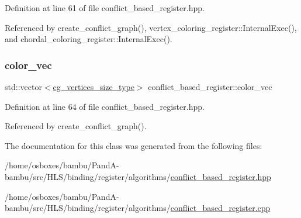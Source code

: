Definition at line 61 of file conflict\+\_\+based\+\_\+register.\+hpp.



Referenced by create\+\_\+conflict\+\_\+graph(), vertex\+\_\+coloring\+\_\+register\+::\+Internal\+Exec(), and chordal\+\_\+coloring\+\_\+register\+::\+Internal\+Exec().

\mbox{\label{classconflict__based__register_af97bd1e6d47a4205d227f72319a234e0}} 
\subsubsection{\texorpdfstring{color\+\_\+vec}{color\_vec}}
{\footnotesize\ttfamily std\+::vector$<$\hyperlink{classconflict__based__register_a7708aaa8ca3c7edc5006102d258ce126}{cg\+\_\+vertices\+\_\+size\+\_\+type}$>$ conflict\+\_\+based\+\_\+register\+::color\+\_\+vec\hspace{0.3cm}{\ttfamily [private]}}



Definition at line 64 of file conflict\+\_\+based\+\_\+register.\+hpp.



Referenced by create\+\_\+conflict\+\_\+graph().



The documentation for this class was generated from the following files\+:\begin{DoxyCompactItemize}
\item 
/home/osboxes/bambu/\+Pand\+A-\/bambu/src/\+H\+L\+S/binding/register/algorithms/\hyperlink{conflict__based__register_8hpp}{conflict\+\_\+based\+\_\+register.\+hpp}\item 
/home/osboxes/bambu/\+Pand\+A-\/bambu/src/\+H\+L\+S/binding/register/algorithms/\hyperlink{conflict__based__register_8cpp}{conflict\+\_\+based\+\_\+register.\+cpp}\end{DoxyCompactItemize}
